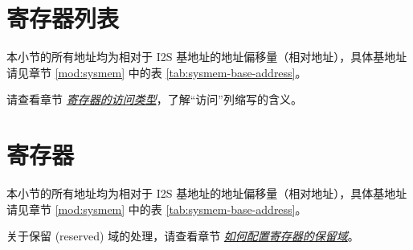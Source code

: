 \documentclass[main\_\_CN.tex]{subfiles}
\begin{document}

\newpage
\hypertarget{i2s-reg-summ}{}
\section{寄存器列表}
\label{sec:i2s-reg-summ}

本小节的所有地址均为相对于 I2S 基地址的地址偏移量（相对地址），具体基地址请见章节 \ref{mod:sysmem} \textit{} 中的表 \ref{tab:sysmem-base-address}。

请查看章节 \hyperref[glossary-access-types]{\textit{寄存器的访问类型}}，了解“访问”列缩写的含义。






\newpage
\section{寄存器}

本小节的所有地址均为相对于 I2S 基地址的地址偏移量（相对地址），具体基地址请见章节 \ref{mod:sysmem} \textit{} 中的表 \ref{tab:sysmem-base-address}。

关于保留 (reserved) 域的处理，请查看章节 \hyperref[programming-reserved-field]{\textit{如何配置寄存器的保留域}}。


\end{document}
